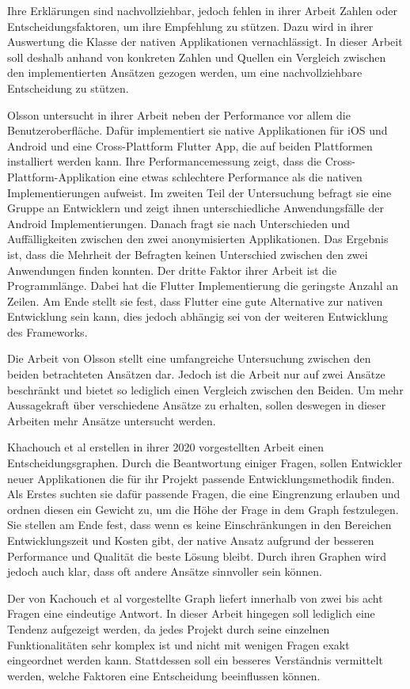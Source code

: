 Ihre Erklärungen sind nachvollziehbar, jedoch fehlen in ihrer Arbeit Zahlen oder Entscheidungsfaktoren, um ihre Empfehlung zu stützen. Dazu wird in ihrer Auswertung die Klasse der nativen Applikationen vernachlässigt. In dieser Arbeit soll deshalb anhand von konkreten Zahlen und Quellen ein Vergleich zwischen den implementierten Ansätzen gezogen werden, um eine nachvollziehbare Entscheidung zu stützen.

Olsson \cite{Olsson_2020} untersucht in ihrer Arbeit neben der Performance vor allem die Benutzeroberfläche. Dafür implementiert sie native Applikationen für iOS und Android und eine Cross-Plattform Flutter App, die auf beiden Plattformen installiert werden kann. Ihre Performancemessung zeigt, dass die Cross-Plattform-Applikation eine etwas schlechtere Performance als die nativen Implementierungen aufweist. Im zweiten Teil der Untersuchung befragt sie eine Gruppe an Entwicklern und zeigt ihnen unterschiedliche Anwendungsfälle der Android Implementierungen. Danach fragt sie nach Unterschieden und Auffälligkeiten zwischen den zwei anonymisierten Applikationen. Das Ergebnis ist, dass die Mehrheit der Befragten keinen Unterschied zwischen den zwei Anwendungen finden konnten. Der dritte Faktor ihrer Arbeit ist die Programmlänge. Dabei hat die Flutter Implementierung die geringste Anzahl an Zeilen. Am Ende stellt sie fest, dass Flutter eine gute Alternative zur nativen Entwicklung sein kann, dies jedoch abhängig sei von der weiteren Entwicklung des Frameworks.
\newline

Die Arbeit von Olsson \cite{Olsson_2020} stellt eine umfangreiche Untersuchung zwischen den beiden betrachteten Ansätzen dar. Jedoch ist die Arbeit nur auf zwei Ansätze beschränkt und bietet so lediglich einen Vergleich zwischen den Beiden. Um mehr Aussagekraft über verschiedene Ansätze zu erhalten, sollen deswegen in dieser Arbeiten mehr Ansätze untersucht werden. 

Khachouch et al \cite{IEEE_Khackouch_Al} erstellen in ihrer 2020 vorgestellten Arbeit einen Entscheidungsgraphen. Durch die Beantwortung einiger Fragen, sollen Entwickler neuer Applikationen die für ihr Projekt passende Entwicklungsmethodik finden. Als Erstes suchten sie dafür passende Fragen, die eine Eingrenzung erlauben und ordnen diesen ein Gewicht zu, um die Höhe der Frage in dem Graph festzulegen. Sie stellen am Ende fest, dass wenn es keine Einschränkungen in den Bereichen Entwicklungszeit und Kosten gibt, der native Ansatz aufgrund der besseren Performance und Qualität die beste Lösung bleibt. Durch ihren Graphen wird jedoch auch klar, dass oft andere Ansätze sinnvoller sein können.

Der von Kachouch et al \cite{IEEE_Khackouch_Al} vorgestellte Graph liefert innerhalb von zwei bis acht Fragen eine eindeutige Antwort. In dieser Arbeit hingegen soll lediglich eine Tendenz aufgezeigt werden, da jedes Projekt durch seine einzelnen Funktionalitäten sehr komplex ist und nicht mit wenigen Fragen exakt eingeordnet werden kann. Stattdessen soll ein besseres Verständnis vermittelt werden, welche Faktoren eine Entscheidung beeinflussen können. 